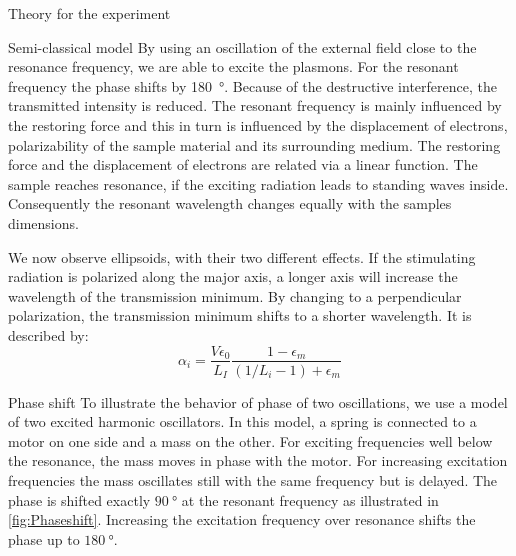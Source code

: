 \documentclass[pdftex, a4paper,11pt, twoside, UKenglish]{report}
\begin{document}
\begin{chapter}{Theory for the experiment}
\begin{section}{Semi-classical model}
        By using an oscillation of the external field close to the resonance
        frequency, we are able to excite the plasmons.
        For the resonant frequency the phase shifts by \SI{180}{\degree}.
        Because of the destructive interference, the transmitted intensity is
        reduced.
        The resonant frequency is mainly influenced by the restoring force
        and this in turn is influenced by the displacement of electrons,
        polarizability of the sample material and its surrounding medium.
        The restoring force and the displacement of electrons are related via
        a linear function.
        The sample reaches resonance, if the exciting radiation leads to standing
        waves inside. 
        Consequently the resonant wavelength changes equally with the samples
        dimensions.  

        We now observe ellipsoids, with their two different effects.
        If the stimulating radiation is polarized along the major axis, a longer
        axis will increase the wavelength of the transmission minimum.
        By changing to a perpendicular polarization, the transmission minimum
        shifts to a shorter wavelength.
        It is described by:
        \begin{equation}
            \alpha_i = \frac{V\epsilon_0}{L_I}\frac{1-\epsilon_m}
            {(1/L_i-1)+\epsilon_m}
        \end{equation}
    \end{section}
    
    
    
    \begin{section}{Phase shift}
      \label{chp:TheoryPhaseshift}
      To illustrate the behavior of phase of two oscillations, we use a model
      of two excited harmonic oscillators. 
      In this model, a spring is connected
      to a motor on one side and a mass on the other. For exciting frequencies
      well below the resonance, the mass moves in phase with the motor.
      For increasing excitation frequencies the mass oscillates still with the
      same frequency but is delayed. The phase is shifted exactly
      $\SI{90}{\degree}$ at the resonant frequency as illustrated in
      \cref{fig:Phaseshift}. Increasing the excitation
      frequency over resonance shifts the phase up to $\SI{180}{\degree}$.
      
    \end{section}
    

\end{chapter}
\end{document}
